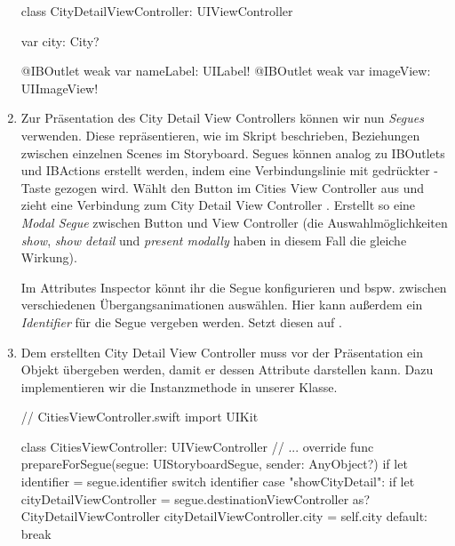 \documentclass[parskip=half, final]{scrreprt}
\begin{document}
\begin{lecture}
\begin{enumerate}
\begin{swiftcode}
class CityDetailViewController: UIViewController {
    var city: City?

    @IBOutlet weak var nameLabel: UILabel!
    @IBOutlet weak var imageView: UIImageView!
}
\end{swiftcode}

\item Zur Präsentation des City Detail View Controllers können wir nun \emph{Segues} verwenden. Diese repräsentieren, wie im Skript beschrieben, Beziehungen zwischen einzelnen Scenes im Storyboard. Segues können analog zu IBOutlets und IBActions erstellt werden, indem eine Verbindungslinie mit gedrückter \keys{\ctrl}-Taste gezogen wird. Wählt den Button im Cities View Controller aus und zieht eine Verbindung zum City Detail View Controller . Erstellt so eine \emph{Modal Segue} zwischen Button und View Controller (die Auswahlmöglichkeiten \emph{show}, \emph{show detail} und \emph{present modally} haben in diesem Fall die gleiche Wirkung). 


Im Attributes Inspector könnt ihr die Segue konfigurieren und bspw. zwischen verschiedenen Übergangsanimationen auswählen. Hier kann außerdem ein \emph{Identifier} für die Segue vergeben werden. Setzt diesen auf .

\item Dem erstellten City Detail View Controller muss vor der Präsentation ein  Objekt übergeben werden, damit er dessen Attribute darstellen kann. Dazu implementieren wir die Instanzmethode  in unserer  Klasse.

\begin{swiftcode}
// CitiesViewController.swift
import UIKit

class CitiesViewController: UIViewController {
    // ...    
    override func prepareForSegue(segue: UIStoryboardSegue, sender: AnyObject?) {
        if let identifier = segue.identifier {
            switch identifier {
            case "showCityDetail":
                if let cityDetailViewController = segue.destinationViewController as? CityDetailViewController {
                    cityDetailViewController.city = self.city
                }
            default:
                break
            }
        }
    }
}
\end{swiftcode}


\end{enumerate}
\end{lecture}
\end{document}
